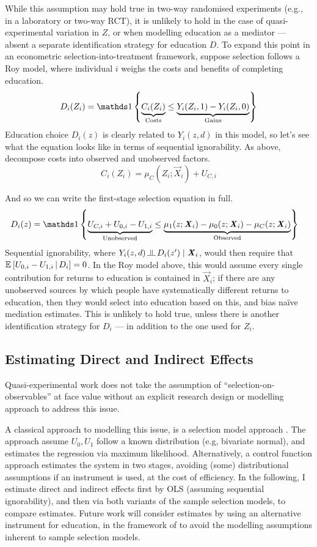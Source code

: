 While this assumption may hold true in two-way randomised experiments (e.g., in a laboratory or two-way RCT), it is unlikely to hold in the case of quasi-experimental variation in $Z$, or when modelling education as a mediator --- absent a separate identification strategy for education $D$.
To expand this point in an econometric selection-into-treatment framework, suppose selection follows a Roy model, where individual $i$ weighs the costs and benefits of completing education.
\[ D_i(Z_i) = \indicator{
    \underbrace{C_i(Z_i)}_{\text{Costs}}
    \leq
    \underbrace{Y_i(Z_i, 1) - Y_i(Z_i, 0)}_{\text{Gains}}} \]
Education choice $D_i(z)$ is clearly related to $Y_i(z, d)$ in this model, so let's see what the equation looks like in terms of sequential ignorability.
As above, decompose costs into observed and unobserved factors.
\[ C_i(Z_i) = \mu_{C}(Z_i; \vec X_i) + U_{C,i} \]

And so we can write the first-stage selection equation in full.
\begin{align*}
    D_i(z) &= \indicator{
        \underbrace{U_{C, i} + U_{0, i} - U_{1, i}}_{\text{Unobserved}}
        \leq
        \underbrace{
            \mu_1(z; \vec X_i) - \mu_0(z; \vec X_i)- \mu_C(z; \vec X_i)}_{\text{Observed}}}
\end{align*}
Sequential ignorability, where $Y_i(z, d) \indep D_i(z') \; | \; \vec X_i$, would then require that $\mathbb{E}_{} \left[ U_{0, i} - U_{1, i} \, \middle\vert \, D_i \right] = 0$.
In the Roy model above, this would assume every single contribution for returns to education is contained in $\vec X_i$; if there are any unobserved sources by which people have systematically different returns to education, then they would select into education based on this, and bias na\"ive mediation estimates.
This is unlikely to hold true, unless there is another identification strategy for $D_i$ --- in addition to the one used for $Z_i$.

\subsection{Estimating Direct and Indirect Effects}

Quasi-experimental work does not take the assumption of ``selection-on-observables'' at face value without an explicit research design \citep{angrist2009mostly} or modelling approach to address this issue.

A classical approach to modelling this issue, is a selection model approach \citep{heckman1974shadow,heckman1979sample}.
The approach assume $U_0, U_1$ follow a known distribution (e.g, bivariate normal), and estimates the regression via maximum likelihood.
Alternatively, a control function approach estimates the system in two stages, avoiding (some) distributional assumptions if an instrument is used, at the cost of efficiency.
In the following, I estimate direct and indirect effects first by OLS (assuming sequential ignorability), and then via both variants of the sample selection models, to compare estimates.
Future work will consider estimates by using an alternative instrument for education, in the framework of \cite{frolich2017direct} to avoid the modelling assumptions inherent to sample selection models.
